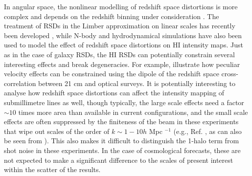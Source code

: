 In angular space, the nonlinear modelling of redshift space distortions is more complex and depends on the redshift binning under consideration \cite{jalilvand2020}.
    The treatment of RSDs in the Limber approximation on linear scales has recently been developed \cite{2019MNRAS.489.3385T}, while N-body and hydrodynamical simulations \cite{seehars2016, villaescusa2018} have also been used to model the effect of redshift space distortions on HI intensity maps. Just as in the case of galaxy RSDs, the HI RSDs can potentially constrain several interesting effects and break degeneracies. For example, \cite{hall2017} illustrate how peculiar velocity effects can be constrained 
using the dipole of the redshift space cross-correlation between 21 cm and 
optical surveys.  It is potentially interesting to analyse how redshift space distortions can affect the intensity mapping of submillimetre lines  \cite{chung2019pi} as well, though typically, the large scale effects need a factor $\sim 10$ times more area than available in current configurations, and the small scale effects are often suppressed by the finiteness of the beam in these experiments that wipe out scales of the order of $k \sim 1 - 10 h$ Mpc $^{-1}$ (e.g., Ref. \cite{schaan2021}, as can also be seen from ). This also makes it difficult to distinguish the 1-halo term from shot noise in these experiments. In the case of cosmological forecasts, these are not expected to make a significant difference to the scales of present interest within the scatter of the results.  



    


